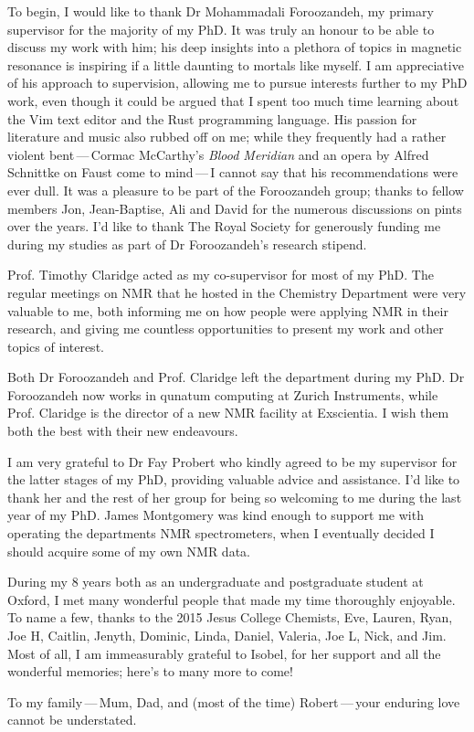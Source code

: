 \begin{acknowledgements}
    To begin, I would like to thank Dr Mohammadali Foroozandeh, my primary
    supervisor for the majority of my PhD. It was truly an honour to be able to
    discuss my work with him; his deep insights into a plethora of
    topics in magnetic resonance is inspiring if a little daunting to
    mortals like myself. I am appreciative of his approach to supervision,
    allowing me to pursue interests further to my PhD work, even though it
    could be argued that I spent too much time learning about the Vim text
    editor and the Rust programming language.
    His passion for literature and music also rubbed off on me; while they
    frequently had a rather violent bent\,---\,Cormac McCarthy's \emph{Blood
    Meridian} and an opera by Alfred Schnittke on Faust come to mind\,---\,I
    cannot say that his recommendations were ever dull.
    It was a pleasure to be part of the Foroozandeh group; thanks to fellow
    members Jon, Jean-Baptise, Ali and David for the numerous discussions on
    pints over the years.
    I'd like to thank The Royal Society for generously
    funding me during my studies as part of Dr Foroozandeh's research stipend.

    Prof. Timothy Claridge acted as my co-supervisor for most of my PhD. The
    regular meetings on NMR that he hosted in the Chemistry Department were
    very valuable to me, both informing me on how people were
    applying NMR in their research, and giving me countless opportunities to
    present my work and other topics of interest.

    Both Dr Foroozandeh and Prof. Claridge left the department during my PhD.
    Dr Foroozandeh now works in qunatum computing at Zurich
    Instruments, while Prof. Claridge is the director of a new NMR facility at
    Exscientia. I wish them both the best with their new endeavours.

    I am very grateful to Dr Fay Probert who kindly agreed to be my supervisor
    for the latter stages of my PhD, providing valuable advice and assistance.
    I'd like to thank her and the rest of her group for being so welcoming to
    me during the last year of my PhD. James Montgomery was kind enough to
    support me with operating the departments NMR spectrometers, when I
    eventually decided I should acquire some of my own NMR data.

    During my 8 years both as an undergraduate and postgraduate student at
    Oxford, I met many wonderful people that made my time thoroughly enjoyable.
    To name a few, thanks to the 2015 Jesus College Chemists, Eve, Lauren,
    Ryan, Joe H, Caitlin, Jenyth, Dominic, Linda, Daniel, Valeria, Joe L, Nick,
    and Jim.  Most of all, I am immeasurably grateful to Isobel, for her
    support and all the wonderful memories; here's to many more to come!

    To my family\,---\,Mum, Dad, and (most of the time) Robert\,---\,your
    enduring love cannot be understated.
\end{acknowledgements}
